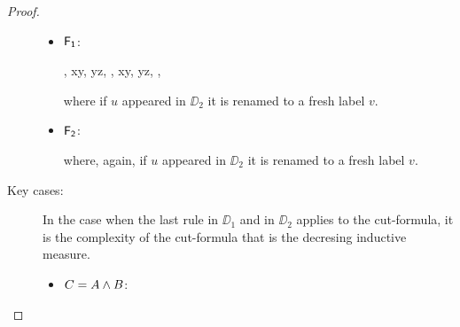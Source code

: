 \begin{proof}
\begin{description}
\begin{itemize}
\item$\mathsf{F_1}$:
\begin{smallequation*}
	{\B, \accs xy, \futs yz, \Left \SEQ \Right}
	{
		{\B, \accs xy, \futs yz, \Left \SEQ \Right, }
		{}}
	{}
\end{smallequation*}
where if $u$ appeared in $\DD_2$ it is renamed to a fresh label $v$.

\item$\mathsf{F_2}$:
\begin{smallequation*}
	{}
	{}
\end{smallequation*}
where, again, if $u$ appeared in $\DD_2$ it is renamed to a fresh label $v$.

\end{itemize}
              \item[Key cases:]\label{key-cases}
                In the case when the last rule in $\DD_1$ and in $\DD_2$ applies to the cut-formula, it is the complexity of the cut-formula that is the decresing inductive measure.
                \begin{itemize}
				\item $C=A \mathbin{\wedge} B$:
				

\end{itemize}
\end{description}
\end{proof}
